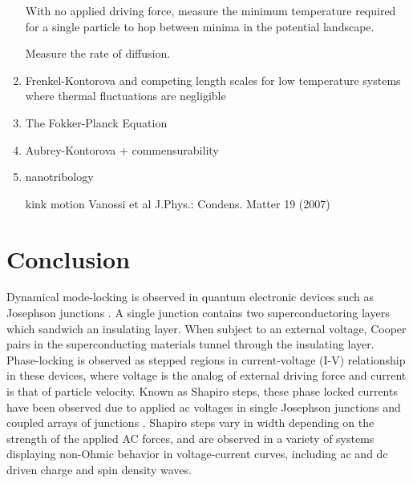 \documentclass[twocolumn,preprintnumbers,amsmath,amssymb,aps,prx]{revtex4}
\begin{document}
\begin{enumerate}
  With no applied driving force, measure the minimum temperature required for a single particle to hop between minima in the potential landscape.

  Measure the rate of diffusion.

\item Frenkel-Kontorova and competing length scales for low temperature systems where thermal fluctuations are negligible

  \item The Fokker-Planck Equation

  \item Aubrey-Kontorova + commensurability

  \item nanotribology

    kink motion
    Vanossi et al J.Phys.: Condens. Matter 19 (2007)


    
\end{enumerate}

\section{Conclusion}
\label{sec:conclusion}	%

Dynamical mode-locking
is %
observed
in quantum electronic
devices such as Josephson junctions \cite{Josephson1962,Josephson1965}.
A single junction contains 
two superconductoring layers which sandwich an insulating layer.
When subject to an external voltage,
Cooper pairs in the superconducting materials
tunnel through the insulating layer.
Phase-locking is observed as 
stepped regions in current-voltage (I-V) relationship in these devices,
where voltage is the analog of external driving force
and current is that of particle velocity.
Known as Shapiro steps, %
these phase locked currents  
have been observed due to applied ac voltages in 
single Josephson junctions \cite{Shapiro1963, Golubov2004} and
coupled arrays of junctions \cite{Benz1990}.
Shapiro steps vary in width depending on the strength of the
applied AC forces,
and are observed in a variety of systems
displaying
non-Ohmic behavior in voltage-current curves,
including
ac and dc driven
charge and spin density waves.
\end{document}
